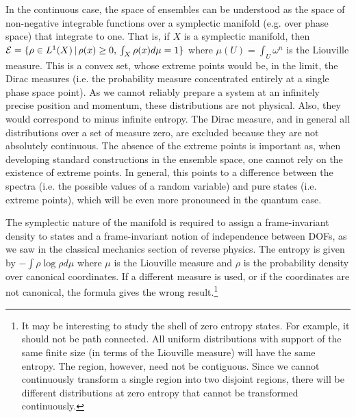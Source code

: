In the continuous case, the space of ensembles can be understood as the space of non-negative integrable functions over a symplectic manifold (e.g.  over phase space) that integrate to one. That is, if $X$ is a symplectic manifold, then $\mathcal{E} = \{ \rho \in L^1(X) \, | \, \rho(x) \geq 0, \, \int_X \rho(x) d\mu = 1 \} $ where $\mu(U)=\int_U \omega^n$ is the Liouville measure. This is a convex set, whose extreme points would be, in the limit, the Dirac measures (i.e. the probability measure concentrated entirely at a single phase space point). As we cannot reliably prepare a system at an infinitely precise position and momentum, these distributions are not physical. Also, they would correspond to minus infinite entropy. The Dirac measure, and in general all distributions over a set of measure zero, are excluded because they are not absolutely continuous. The absence of the extreme points is important as, when developing standard constructions in the ensemble space, one cannot rely on the existence of extreme points. In general, this points to a difference between the spectra (i.e. the possible values of a random variable) and pure states (i.e. extreme points), which will be even more pronounced in the quantum case.

The symplectic nature of the manifold is required to assign a frame-invariant density to states and a frame-invariant notion of independence between DOFs, as we saw in the classical mechanics section of reverse physics. The entropy is given by $- \int \rho \log \rho d\mu$ where $\mu$ is the Liouville measure and $\rho$ is the probability density over canonical coordinates. If a different measure is used, or if the coordinates are not canonical, the formula gives the wrong result.\footnote{It may be interesting to study the shell of zero entropy states. For example, it should not be path connected. All uniform distributions with support of the same finite size (in terms of the Liouville measure) will have the same entropy. The region, however, need not be contiguous. Since we cannot continuously transform a single region into two disjoint regions, there will be different distributions at zero entropy that cannot be transformed continuously.}


